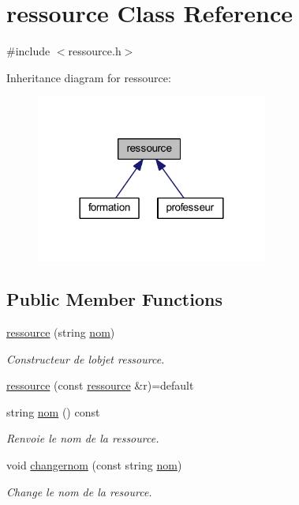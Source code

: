 \hypertarget{classressource}{}\section{ressource Class Reference}
\label{classressource}


{\ttfamily \#include $<$ressource.\+h$>$}



Inheritance diagram for ressource\+:\nopagebreak
\begin{figure}[H]
\begin{center}
\leavevmode
\includegraphics[width=216pt]{classressource__inherit__graph}
\end{center}
\end{figure}
\subsection*{Public Member Functions}
\begin{DoxyCompactItemize}
\item 
\hyperlink{classressource_a261f4c729d03d562e1d35187999ce4ef}{ressource} (string \hyperlink{classressource_aff712b6d732b3f4091dd29f4349aba85}{nom})
\begin{DoxyCompactList}\small\item\em Constructeur de l\textquotesingle{}objet ressource. \end{DoxyCompactList}\item 
\hyperlink{classressource_adccfe979d5ccf07ae4f0cfa944e9f1b0}{ressource} (const \hyperlink{classressource}{ressource} \&r)=default
\item 
string \hyperlink{classressource_aff712b6d732b3f4091dd29f4349aba85}{nom} () const
\begin{DoxyCompactList}\small\item\em Renvoie le nom de la ressource. \end{DoxyCompactList}\item 
void \hyperlink{classressource_a2c2b1bee5ae87b3accdd84c088aef2fd}{changernom} (const string \hyperlink{classressource_aff712b6d732b3f4091dd29f4349aba85}{nom})
\begin{DoxyCompactList}\small\item\em Change le nom de la resource. \end{DoxyCompactList}\end{DoxyCompactItemize}


